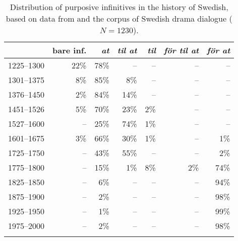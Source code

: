 \documentclass[output=paper]{langscibook}
\begin{document}
\begin{table}
\caption{Distribution of purposive infinitives in the history of Swedish, based on data from \citet{Kalm2016Satsekvivalenta} and the corpus of Swedish drama dialogue ($N = 1230$).\label{tab:kalm:2}}
\begin{tabular}{lrrrrrr} 
\lsptoprule
& bare inf. & \textit{at}  & \textit{til at}  & \textit{til}  & \textit{för til at}  & \textit{för at} \\\midrule
1225–1300 & 22\% & 78\% & – & – & – & –\\
1301–1375 & 8\% & 85\% & 8\% & – & – & –\\
1376–1450 & 2\% & 84\% & 14\% & – & – & –\\
1451–1526 & 5\% & 70\% & 23\% & 2\% & – & –\\
1527–1600 & – & 25\% & 74\% & 1\% & – & –\\
1601–1675 & 3\% & 66\% & 30\% & 1\% & – & 1\%\\
1725–1750 & – & 43\% & 55\% & – & – & 2\%\\
1775–1800 & – & 15\% & 1\% & 8\% & 2\% & 74\%\\
1825–1850 & – & 6\% & – & – & – & 94\%\\
1875–1900 & – & 2\% & – & – & – & 98\%\\
1925–1950 & – & 1\% & – & – & – & 99\%\\
1975–2000 & – & 2\% & – & – & – & 98\%\\
\lspbottomrule
\end{tabular}
\end{table}
\end{document}
